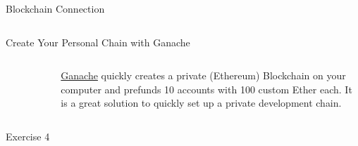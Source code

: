 \documentclass[]{beamer}
\begin{document}
\begin{frame}{Blockchain Connection}
{\begin{columns}[T]
	\end{columns}
	}
	
\end{frame}

\begin{frame}{Create Your Personal Chain with Ganache}

	\begin{columns}
		\begin{column}{0.15\textwidth}
			\begin{figure}
				\includegraphics[width = \textwidth]{../assets/images/logo_ganache.png}
			\end{figure}
		\end{column}
		\begin{column}{0.85\textwidth}
			\href{https://www.trufflesuite.com/ganache}{\link Ganache} quickly creates a private (Ethereum) Blockchain on your computer and prefunds 10 accounts with 100 custom Ether each. It is a great solution to quickly set up a private development chain.
		\end{column}
	\end{columns}
	\vspace{1.5em}
	\begin{exercise}{Exercise 4}

\end{exercise}
\end{frame}
\end{document}
